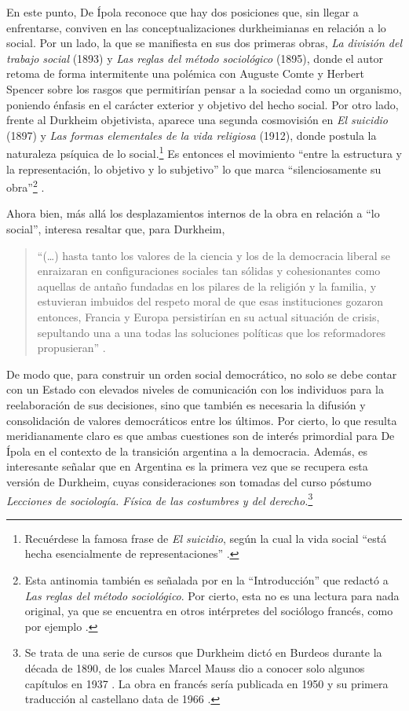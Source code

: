 {En este punto, De Ípola reconoce que hay dos posiciones que, sin llegar a enfrentarse, conviven en las conceptualizaciones durkheimianas en relación a lo social. Por un lado, la que se manifiesta en sus dos primeras obras, \emph{La división del trabajo social} (1893) y \emph{Las reglas del método sociológico} (1895), donde el autor retoma de forma intermitente una polémica con Auguste Comte y Herbert Spencer sobre los rasgos que permitirían pensar a la sociedad como un organismo, poniendo énfasis en el carácter exterior y objetivo del hecho social. Por otro lado, frente al Durkheim objetivista, aparece una segunda cosmovisión en \emph{El suicidio} (1897) y \emph{Las formas elementales de la vida religiosa} (1912), donde postula la naturaleza psíquica de lo social.\footnote{Recuérdese la famosa frase de \emph{El suicidio}, según la cual la vida social \enquote{está hecha esencialmente de representaciones} \parencite[429]{1617-DURKHEIM2006}.} Es entonces el movimiento \enquote{entre la estructura y la representación, lo objetivo y lo subjetivo} lo que marca \enquote{silenciosamente su obra}\footnote{Esta antinomia también es señalada por \textcite{1618-DEIPOLA2012} en la \enquote{Introducción} que redactó a \emph{Las reglas del método sociológico}. Por cierto, esta no es una lectura para nada original, ya que se encuentra en otros intérpretes del sociólogo francés, como por ejemplo \textcite{1700-MITCHELL1973}.} \parencite[44]{1592-DEIPOLA1997}.

Ahora bien, más allá los desplazamientos internos de la obra en relación a \enquote{lo social}, interesa resaltar que, para Durkheim,

\begin{quote}
\enquote{(\dots) hasta tanto los valores de la ciencia y los de la democracia liberal se enraizaran en configuraciones sociales tan sólidas y cohesionantes como aquellas de antaño fundadas en los pilares de la religión y la familia, y estuvieran imbuidos del respeto moral de que esas instituciones gozaron entonces, Francia y Europa persistirían en su actual situación de crisis, sepultando una a una todas las soluciones políticas que los reformadores propusieran} \parencite[46]{1592-DEIPOLA1997}.
\end{quote}

De modo que, para construir un orden social democrático, no solo se debe contar con un Estado con elevados niveles de comunicación con los individuos para la reelaboración de sus decisiones, sino que también es necesaria la difusión y consolidación de valores democráticos entre los últimos. Por cierto, lo que resulta meridianamente claro es que ambas cuestiones son de interés primordial para De Ípola en el contexto de la transición argentina a la democracia. Además, es interesante señalar que en Argentina es la primera vez que se recupera esta versión de Durkheim, cuyas consideraciones son tomadas del curso póstumo \emph{Lecciones de sociología. Física de las costumbres y del derecho.}\footnote{Se trata de una serie de cursos que Durkheim dictó en Burdeos durante la década de 1890, de los cuales Marcel Mauss dio a conocer solo algunos capítulos en 1937 \parencite{1443-BOUGLE1938}. La obra en francés sería publicada en 1950 y su primera traducción al castellano data de 1966 \parencite{1449-CATANO1998}.}

}
